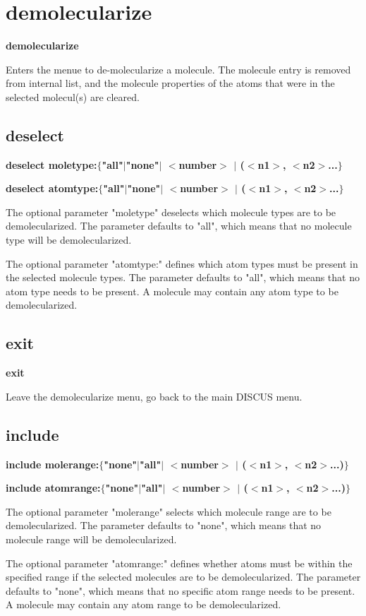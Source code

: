 \section{demolecularize}
{\bf demolecularize \par }
\par
\vspace{3pt}
Enters the menue to de-molecularize a molecule. 
The molecule entry is removed from internal list, and the 
molecule properties of the atoms that were in the selected 
molecul(s) are cleared. 
\par
\subsection*{deselect}
{\bf deselect moletype:$ \{$"all"$| $"none"$| $ $ <$number$> $ $| $ ($ <$n1$> $, $ <$n2$> $...$\} $ \par }
{\bf deselect atomtype:$ \{$"all"$| $"none"$| $ $ <$number$> $ $| $ ($ <$n1$> $, $ <$n2$> $...$\} $ \par }
\par
\vspace{3pt}
The optional parameter "moletype" deselects which molecule 
types are to be demolecularized. 
The parameter defaults to "all", which means that no 
molecule type will be demolecularized. 
\par
The optional parameter "atomtype:" defines which atom 
types must be present in the selected molecule types. 
The parameter defaults to "all", which means that no 
atom type needs to be present. A molecule may contain 
any atom type to be demolecularized. 
\subsection*{exit}
{\bf exit \par }
\par
\vspace{3pt}
Leave the demolecularize menu, go back to the main 
DISCUS menu. 
\subsection*{include}
{\bf include molerange:$ \{$"none"$| $"all"$| $ $ <$number$> $ $| $ ($ <$n1$> $, $ <$n2$> $...)$\} $ \par }
{\bf include atomrange:$ \{$"none"$| $"all"$| $ $ <$number$> $ $| $ ($ <$n1$> $, $ <$n2$> $...)$\} $ \par }
\par
\vspace{3pt}
The optional parameter "molerange" selects which molecule 
range are to be demolecularized. 
The parameter defaults to "none", which means that no 
molecule range will be demolecularized. 
\par
The optional parameter "atomrange:" defines whether atoms 
must be within the specified range if the selected 
molecules are to be demolecularized. 
The parameter defaults to "none", which means that no 
specific atom range needs to be present. A molecule may 
contain any atom range to be demolecularized. 
